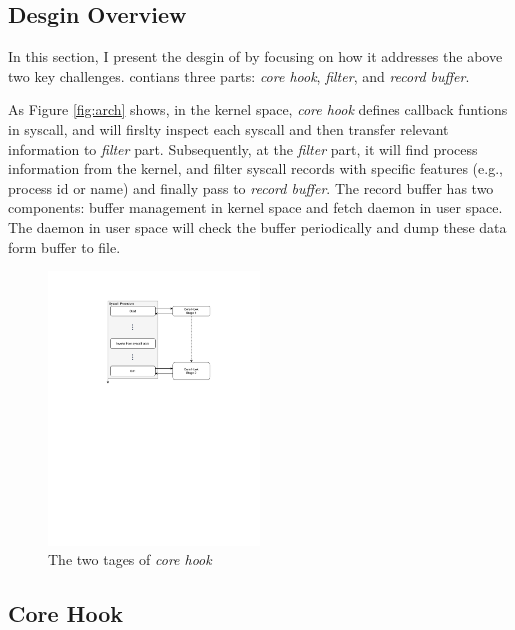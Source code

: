 
\subsection{Desgin Overview}

In this section, I present the desgin of \TheName by focusing on how it addresses the above two key challenges. \TheName contians three parts: \textit{core hook}, \textit{filter}, and \textit{record buffer}. 

As Figure \ref{fig:arch} shows, in the kernel space, \textit{core hook} defines callback funtions in syscall, and will firslty inspect each syscall and then transfer relevant information to \textit{filter} part. Subsequently, at the \textit{filter} part, it will find process information from the kernel, and filter syscall records with specific features (e.g., process id or name) and finally pass to \textit{record buffer}. The record buffer has two components: buffer management in kernel space and fetch daemon in user space. The daemon in user space will check the buffer periodically and dump these data form buffer to file.

\begin{figure}
    \centering
    \includegraphics[width=0.5\textwidth]{figures/core-hook-desgin.pdf}
    \caption{The two tages of \textit{core hook}}
    \label{fig:core-hook-desgin}
\end{figure}


\subsection{Core Hook}

